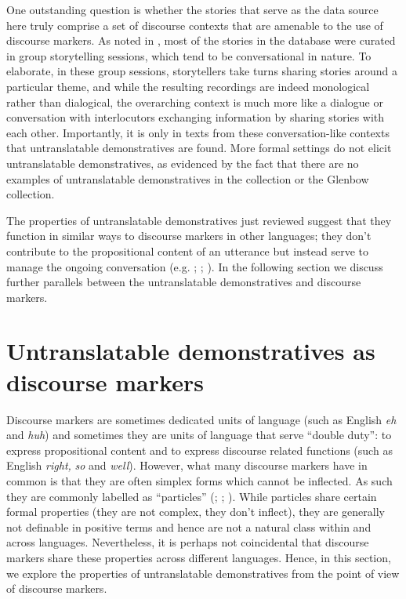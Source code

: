 \documentclass[output=paper,colorlinks,citecolor=brown]{langscibook}
\begin{document}
One outstanding question is whether the stories that serve as the data source here truly comprise a set of discourse contexts that are amenable to the use of discourse markers. As noted in , most of the stories in the database were curated in group storytelling sessions, which tend to be conversational in nature. To elaborate, in these group sessions, storytellers take turns sharing stories around a particular theme, and while the resulting recordings are indeed monological rather than dialogical, the overarching context is much more like a dialogue or conversation with interlocutors exchanging information by sharing stories with each other. Importantly, it is only in texts from these conversation-like contexts that untranslatable demonstratives are found. More formal settings do not elicit untranslatable demonstratives, as evidenced by the fact that there are no examples of untranslatable demonstratives in the \citet{RussellGenee2014} collection or the Glenbow collection. 

The properties of untranslatable demonstratives just reviewed suggest that they function in similar ways to discourse markers in other languages; they don’t contribute to the propositional content of an utterance but instead serve to manage the ongoing conversation (e.g. \citealt{Ariel1998}; \citealt{Fairbanks2016}; \citealt{Schiffrin1987}). In the following section we discuss further parallels between the untranslatable demonstratives and discourse markers.


\section{Untranslatable demonstratives as discourse markers}\label{sec:bliss:5}


Discourse markers are sometimes dedicated units of language (such as English \textit{eh} and \textit{huh}) and sometimes they are units of language that serve “double duty”: to express propositional content and to express discourse related functions (such as English \textit{right,} \textit{so} and \textit{well}). However, what many discourse markers have in common is that they are often simplex forms which cannot be inflected. As such they are commonly labelled as “particles” (\citealt{Abraham1991}; \citealt{Aijmer2002}; \citealt{Zimmermann2011}). While particles share certain formal properties (they are not complex, they don’t inflect), they are generally not definable in positive terms and hence are not a natural class within and across languages. Nevertheless, it is perhaps not coincidental that discourse markers share these properties across different languages. Hence, in this section, we explore the properties of untranslatable demonstratives from the point of view of discourse markers.
\end{document}
